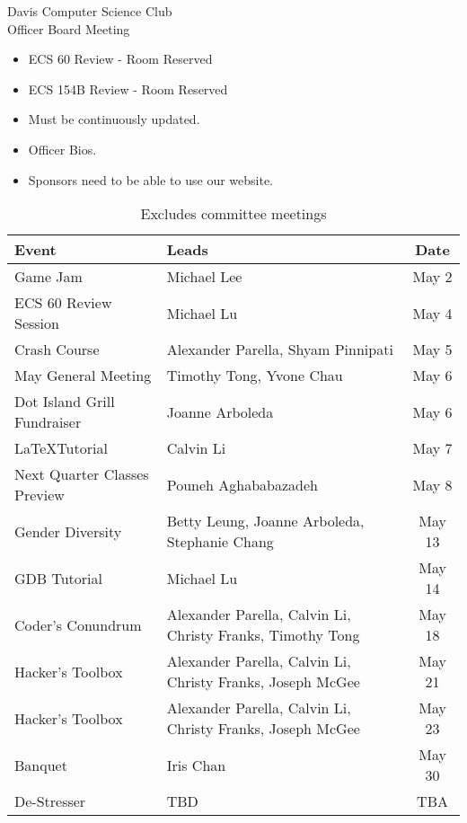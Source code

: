 \documentclass{article}
\begin{document}
\begin{Minutes}{Davis Computer Science Club\\Officer Board Meeting}
\begin{itemize}
	\item ECS 60 Review - Room Reserved
	\item ECS 154B Review - Room Reserved
\end{itemize}


\begin{itemize}
	\item Must be continuously updated.
	\item Officer Bios.
	\item Sponsors need to be able to use our website.
\end{itemize}


\begin{table}[h]
	\centering
	\renewcommand*{\arraystretch}{1.5}
	\begin{tabular}{l l c}
		Event
			&	Leads
			&	Date\\
		\hline
		Game Jam
			&	Michael Lee
			&	May 2\\
		ECS 60 Review Session
			&	Michael Lu
			&	May 4\\
		Crash Course
			&	Alexander Parella, Shyam Pinnipati
			&	May 5\\
		May General Meeting
			&	Timothy Tong, Yvone Chau
			&	May 6\\
		Dot Island Grill Fundraiser
			&	Joanne Arboleda
			&	May 6\\
		\LaTeX Tutorial
			&	Calvin Li
			&	May 7\\
		Next Quarter Classes Preview
			&	Pouneh Aghababazadeh
			&	May 8\\
		Gender Diversity	
			&	Betty Leung, Joanne Arboleda, Stephanie Chang
			&	May 13\\
		GDB Tutorial
			&	Michael Lu
			&	May 14\\
		Coder's Conundrum	
			&	Alexander Parella, Calvin Li, Christy Franks, Timothy Tong
			&	May 18\\
		Hacker's Toolbox
			&	Alexander Parella, Calvin Li, Christy Franks, Joseph McGee
			&	May 21\\
		Hacker's Toolbox
			&	Alexander Parella, Calvin Li, Christy Franks, Joseph McGee
			&	May 23\\
		Banquet
			&	Iris Chan
			&	May 30\\
		De-Stresser
			&	TBD
			&	TBA\\
	\end{tabular}
	\caption*{Excludes committee meetings}
\end{table}


\end{Minutes}
\end{document}
